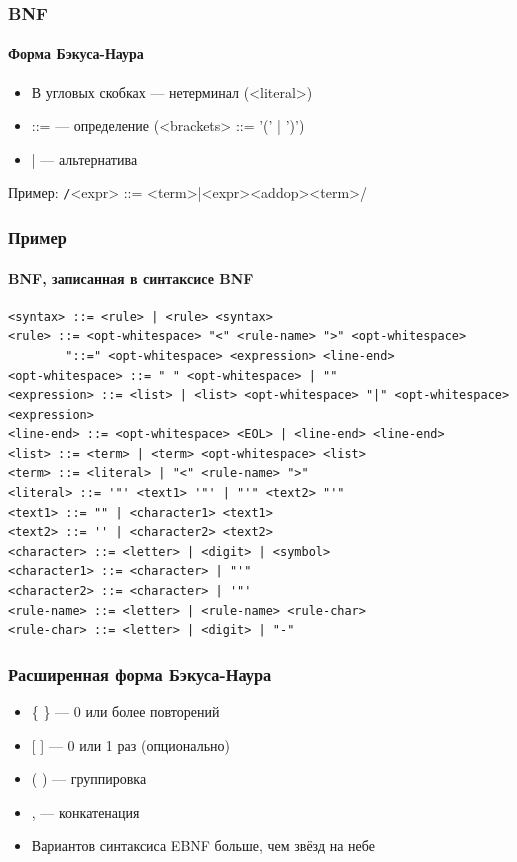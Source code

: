 \documentclass[xetex,mathserif,serif]{beamer}
\begin{document}
	\begin{frame}
		\frametitle{BNF}
		\framesubtitle{Форма Бэкуса-Наура}
		\begin{itemize}
			\item В угловых скобках --- нетерминал (<literal>)
			\item ::= --- определение (<brackets> ::= '(' | ')')
			\item | --- альтернатива
		\end{itemize}
		Пример: \texttt/<expr> ::= <term>|<expr><addop><term>/
	\end{frame}

	\begin{frame}[fragile]
		\frametitle{Пример}
		\framesubtitle{BNF, записанная в синтаксисе BNF}
		\begin{footnotesize}
			\begin{verbatim}
<syntax> ::= <rule> | <rule> <syntax>
<rule> ::= <opt-whitespace> "<" <rule-name> ">" <opt-whitespace> 
        "::=" <opt-whitespace> <expression> <line-end>
<opt-whitespace> ::= " " <opt-whitespace> | ""
<expression> ::= <list> | <list> <opt-whitespace> "|" <opt-whitespace> <expression>
<line-end> ::= <opt-whitespace> <EOL> | <line-end> <line-end>
<list> ::= <term> | <term> <opt-whitespace> <list>
<term> ::= <literal> | "<" <rule-name> ">"
<literal> ::= '"' <text1> '"' | "'" <text2> "'"
<text1> ::= "" | <character1> <text1>
<text2> ::= '' | <character2> <text2>
<character> ::= <letter> | <digit> | <symbol>
<character1> ::= <character> | "'"
<character2> ::= <character> | '"'
<rule-name> ::= <letter> | <rule-name> <rule-char>
<rule-char> ::= <letter> | <digit> | "-"
			\end{verbatim}
		\end{footnotesize}
	\end{frame}

	\begin{frame}
		\frametitle{Расширенная форма Бэкуса-Наура}
		\begin{itemize}
			\item \{ \} --- 0 или более повторений
			\item {[ ]} --- 0 или 1 раз (опционально)
			\item ( ) --- группировка
			\item , --- конкатенация
			\item Вариантов синтаксиса EBNF больше, чем звёзд на небе
		\end{itemize}
	\end{frame}
\end{document}
